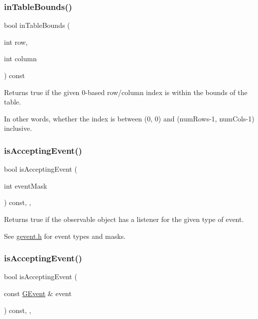 \subsubsection{\texorpdfstring{in\+Table\+Bounds()}{inTableBounds()}}
{\footnotesize\ttfamily bool in\+Table\+Bounds (\begin{DoxyParamCaption}\item[{int}]{row,  }\item[{int}]{column }\end{DoxyParamCaption}) const\hspace{0.3cm}{\ttfamily [virtual]}}



Returns true if the given 0-\/based row/column index is within the bounds of the table. 

In other words, whether the index is between (0, 0) and (num\+Rows-\/1, num\+Cols-\/1) inclusive. \mbox{\label{classGObservable_aeec1adc19aa0f33de62390686ee1382c}} 
\subsubsection{\texorpdfstring{is\+Accepting\+Event()}{isAcceptingEvent()}\hspace{0.1cm}{\footnotesize\ttfamily [1/3]}}
{\footnotesize\ttfamily bool is\+Accepting\+Event (\begin{DoxyParamCaption}\item[{int}]{event\+Mask }\end{DoxyParamCaption}) const\hspace{0.3cm}{\ttfamily [protected]}, {\ttfamily [virtual]}, {\ttfamily [inherited]}}



Returns true if the observable object has a listener for the given type of event. 

See \mbox{\hyperlink{gevent_8h_source}{gevent.\+h}} for event types and masks. \mbox{\label{classGObservable_aa31c73145a29dcb92848a92e0cfaea41}} 
\subsubsection{\texorpdfstring{is\+Accepting\+Event()}{isAcceptingEvent()}\hspace{0.1cm}{\footnotesize\ttfamily [2/3]}}
{\footnotesize\ttfamily bool is\+Accepting\+Event (\begin{DoxyParamCaption}\item[{const \mbox{\hyperlink{classGEvent}{G\+Event}} \&}]{event }\end{DoxyParamCaption}) const\hspace{0.3cm}{\ttfamily [protected]}, {\ttfamily [virtual]}, {\ttfamily [inherited]}}



